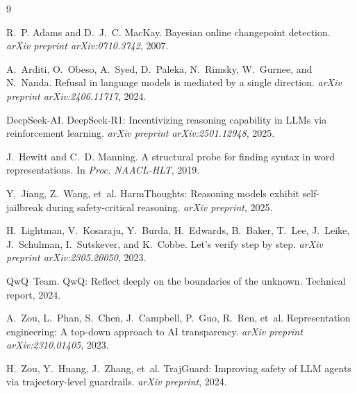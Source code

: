 \documentclass[11pt,a4paper]{article}
\begin{document}
\begin{thebibliography}{9}

R.~P. Adams and D.~J.~C. MacKay.
\newblock Bayesian online changepoint detection.
\newblock \emph{arXiv preprint arXiv:0710.3742}, 2007.

A.~Arditi, O.~Obeso, A.~Syed, D.~Paleka, N.~Rimsky, W.~Gurnee, and N.~Nanda.
\newblock Refusal in language models is mediated by a single direction.
\newblock \emph{arXiv preprint arXiv:2406.11717}, 2024.

DeepSeek-AI.
\newblock DeepSeek-R1: Incentivizing reasoning capability in LLMs via reinforcement learning.
\newblock \emph{arXiv preprint arXiv:2501.12948}, 2025.

J.~Hewitt and C.~D. Manning.
\newblock A structural probe for finding syntax in word representations.
\newblock In \emph{Proc. NAACL-HLT}, 2019.

Y.~Jiang, Z.~Wang, et~al.
\newblock HarmThoughts: Reasoning models exhibit self-jailbreak during safety-critical reasoning.
\newblock \emph{arXiv preprint}, 2025.

H.~Lightman, V.~Kosaraju, Y.~Burda, H.~Edwards, B.~Baker, T.~Lee, J.~Leike, J.~Schulman, I.~Sutskever, and K.~Cobbe.
\newblock Let's verify step by step.
\newblock \emph{arXiv preprint arXiv:2305.20050}, 2023.

QwQ~Team.
\newblock QwQ: Reflect deeply on the boundaries of the unknown.
\newblock Technical report, 2024.

A.~Zou, L.~Phan, S.~Chen, J.~Campbell, P.~Guo, R.~Ren, et~al.
\newblock Representation engineering: A top-down approach to AI transparency.
\newblock \emph{arXiv preprint arXiv:2310.01405}, 2023.

H.~Zou, Y.~Huang, J.~Zhang, et~al.
\newblock TrajGuard: Improving safety of LLM agents via trajectory-level guardrails.
\newblock \emph{arXiv preprint}, 2024.

\end{thebibliography}
\end{document}
